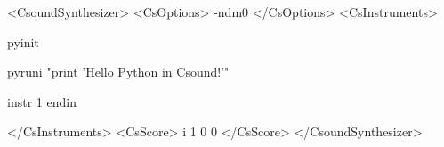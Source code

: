 <CsoundSynthesizer>
<CsOptions>
-ndm0
</CsOptions>
<CsInstruments>

pyinit

pyruni "print 'Hello Python in Csound!'"

instr 1
endin

</CsInstruments>
<CsScore>
i 1 0 0
</CsScore>
</CsoundSynthesizer>